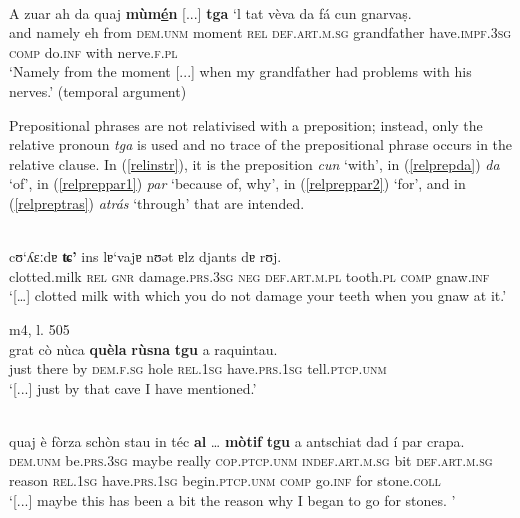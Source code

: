 \ea\label{}
\\
\gll A zuar ah da quaj \textbf{mùm\underline{é}n} [...] \textbf{tga} `l tat vèva da fá cun gnarvaṣ. \\
and namely eh from \textsc{dem.unm} moment {} \textsc{rel} \textsc{def.art.m.sg} grandfather have.\textsc{impf.3sg} \textsc{comp} do.\textsc{inf} with nerve.\textsc{f.pl} \\ 
\glt `Namely from the moment [...] when my grandfather had problems with his nerves.' (temporal argument)
\z

Prepositional phrases are not relativised with a preposition; instead, only the relative pronoun \textit{tga} is used and no trace of the prepositional phrase occurs in the relative clause. In (\ref{relinstr}), it is the preposition \textit{cun} `with', in (\ref{relprepda}) \textit{da} `of', in (\ref{relpreppar1}) \textit{par} `because of, why', in (\ref{relpreppar2}) `for', and in (\ref{relpreptras}) \textit{atrás} `through' that are intended.

\ea\label{relinstr}
\\
\gll    […] cʊ‘ʎɛːdɐ \textbf{ʨ'} ins lɐ‘vajɐ nʊǝt ɐlz djants dɐ rʊj.\\
{} clotted.milk \textsc{rel} \textsc{gnr} damage.\textsc{prs.3sg} \textsc{neg} \textsc{def.art.m.pl} tooth.\textsc{pl} \textsc{comp} gnaw.\textsc{inf} \\
\glt `[…] clotted milk with which you do not damage your teeth when you gnaw at it.'
\z

\ea\label{relprepda}
 {m4, l. 505}\\
\gll [...] grat cò nùca \textbf{quèla} \textbf{rùsna} \textbf{tgu} a raquintau.\\
{} just there by \textsc{dem.f.sg} hole \textsc{rel.1sg} have.\textsc{prs.1sg} tell.\textsc{ptcp.unm}\\  
\glt `[...] just by that cave I have mentioned.'
\z

\ea\label{relpreppar1}
\\
\gll  [...] quaj è fòrza schòn stau in téc \textbf{al} … \textbf{mòtif} \textbf{tgu} a antschiat dad í par crapa.\\
{} \textsc{dem.unm} be.\textsc{prs.3sg} maybe really  \textsc{cop.ptcp.unm} \textsc{indef.art.m.sg} bit \textsc{def.art.m.sg} {} reason \textsc{rel.1sg} have.\textsc{prs.1sg} begin.\textsc{ptcp.unm} \textsc{comp} go.\textsc{inf} for stone.\textsc{coll}\\
\glt `[...] maybe this has been a bit the reason why I began to go for stones. '
\z

